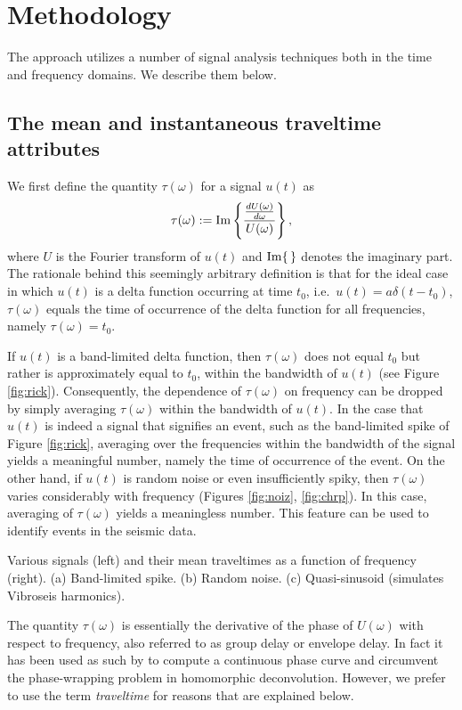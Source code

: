 \section{Methodology}
The approach utilizes a number of signal analysis techniques both in the time and frequency domains. We describe them below.
\subsection{The mean and instantaneous traveltime attributes}
We first define the quantity $\tau(\omega)$ for a signal $u(t)$ as 
\begin{equation}\label{eq:tau_def}
   \tau(\omega) := \mathrm{Im}\left\{\frac{\frac{dU(\omega)}{d\omega}}{U(\omega)}\right\},
\end{equation}
where $U$ is the Fourier transform of $u(t)$ and $\mathrm{Im}\{\,\}$ denotes the imaginary part. The rationale behind this seemingly arbitrary definition is that for the ideal case in which $u(t)$ is a delta function occurring at time $t_0$, i.e.\ $u(t)=a\delta(t-t_0)$, $\tau(\omega)$ equals the time of occurrence of the delta function for all frequencies, namely $\tau(\omega) = t_0$.

If $u(t)$ is a band-limited delta function, then $\tau(\omega)$ does not equal $t_0$ but rather is approximately equal to $t_0$, within the bandwidth of $u(t)$ (see Figure \ref{fig:rick}). Consequently, the dependence of $\tau(\omega)$ on frequency can be dropped by simply averaging $\tau(\omega)$ within the bandwidth of $u(t)$. In the case that $u(t)$ is indeed a signal that signifies an event, such as the band-limited spike of Figure \ref{fig:rick}, averaging over the frequencies within the bandwidth of the signal yields a meaningful number, namely the time of occurrence of the event. On the other hand, if $u(t)$ is random noise or even insufficiently spiky, then $\tau(\omega)$ varies considerably with frequency (Figures \ref{fig:noiz}, \ref{fig:chrp}). In this case, averaging of $\tau(\omega)$ yields a meaningless number. This feature can be used to identify events in the seismic data. 

{Various signals (left) and their mean traveltimes as a function of frequency (right). (a) Band-limited spike. (b) Random noise. (c) Quasi-sinusoid (simulates Vibroseis harmonics).}


The quantity $\tau(\omega)$ is essentially the derivative of the phase of $U(\omega)$ with respect to frequency, also referred to as group delay or envelope delay. In fact it has been used as such by \cite{stoffa74homo1} to compute a continuous phase curve and circumvent the phase-wrapping problem in homomorphic deconvolution. However, we prefer to use the term \emph{traveltime} for reasons that are explained below. 

